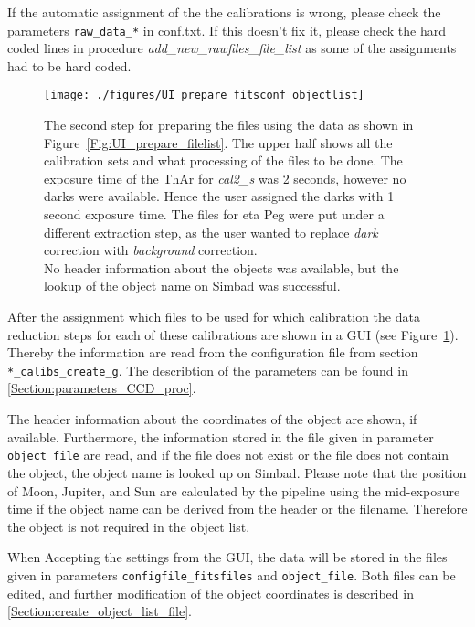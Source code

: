 \documentclass[10pt,a4paper]{article}
\begin{document}
\noindent If the automatic assignment of the the calibrations is wrong, please check the parameters \verb|raw_data_*| in conf.txt. If this doesn't fix it, please check the hard coded lines in procedure \textit{add\_new\_rawfiles\_file\_list} as some of the assignments had to be hard coded.

\begin{figure} 
  \begin{center}
    \texttt{[image: ./figures/UI\_prepare\_fitsconf\_objectlist]}
  \end{center} 
  \caption{The second step for preparing the files using the data as shown in Figure~\ref{Fig:UI_prepare_filelist}. The upper half shows all the calibration sets and what processing of the files to be done. The exposure time of the ThAr for \textit{cal2\_s} was 2 seconds, however no darks were available. Hence the user assigned the darks with 1 second exposure time. The files for eta Peg were put under a different extraction step, as the user wanted to replace \textit{dark} correction with \textit{background} correction. \\
    No header information about the objects was available, but the lookup of the object name on Simbad was successful.
    \label{Fig:UI_prepare_fitsconf_objectlist}}
\end{figure}

After the assignment which files to be used for which calibration the data reduction steps for each of these calibrations are shown in a GUI (see Figure~\ref{Fig:UI_prepare_fitsconf_objectlist}). Thereby the information are read from the configuration file from section \verb|*_calibs_create_g|. The describtion of the parameters can be found in \ref{Section:parameters_CCD_proc}.

\noindent The header information about the coordinates of the object are shown, if available. Furthermore, the information stored in the file given in parameter \verb|object_file| are read, and if the file does not exist or the file does not contain the object, the object name is looked up on Simbad. Please note that the position of Moon, Jupiter, and Sun are calculated by the pipeline using the mid-exposure time if the object name can be derived from the header or the filename. Therefore the object is not required in the object list.

\noindent When Accepting the settings from the GUI, the data will be stored in the files given in parameters \verb|configfile_fitsfiles| and \verb|object_file|. Both files can be edited, and further modification of the object coordinates is described in \ref{Section:create_object_list_file}.
\end{document}
